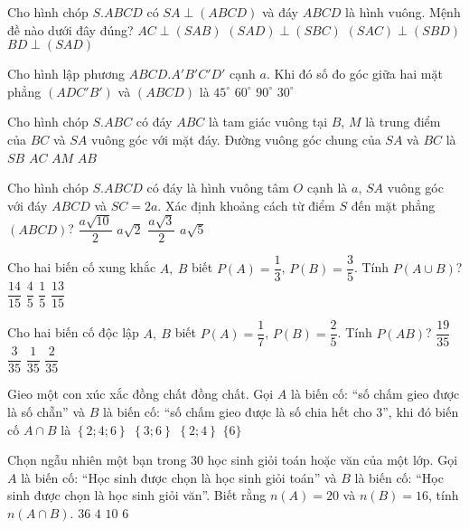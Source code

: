 \begin{ex}
Cho hình chóp $S.ABCD$ có $SA\perp (ABCD)$ và đáy $ABCD$ là hình vuông. Mệnh đề nào dưới đây đúng?
\choice
{$AC\perp (SAB)$}
{$(SAD)\perp (SBC)$}
{$(SAC)\perp (SBD)$}
{$BD\perp (SAD)$}
\end{ex}
\begin{ex}
Cho hình lập phương $ABCD.A'B'C'D'$ cạnh $a$. Khi đó số đo góc giữa hai mặt phẳng $\left(ADC'B'\right)$ và $(ABCD)$ là
\choice
{$45^\circ $}
{$60^\circ $}
{$90^\circ $}
{$30^\circ $}
\end{ex}
\begin{ex}
Cho hình chóp $S.ABC$ có đáy $ABC$ là tam giác vuông tại $B$, $M$ là trung điểm của $BC$ và $SA$ vuông góc với mặt đáy. Đường vuông góc chung của $SA$ và $BC$ là
\choice
{$SB$}
{$AC$}
{$AM$}
{$AB$}
\end{ex}
\begin{ex}
Cho hình chóp $S.ABCD$ có đáy là hình vuông tâm $O$ cạnh là $a$, $SA$ vuông góc với đáy $ABCD$ và $SC=2a$. Xác định khoảng cách từ điểm $S$ đến mặt phẳng$(ABCD)$?
\choice
{$\dfrac{a\sqrt{10}}{2}$}
{$a\sqrt{2}$}
{$\dfrac{a\sqrt{3}}{2}$}
{$a\sqrt{5}$}
\end{ex}
\begin{ex}
Cho hai biến cố xung khắc $A,\ B$ biết $P(A)=\dfrac{1}{3}$, $P(B)=\dfrac{3}{5}$. Tính $P\left(A\cup B\right)$?
\choice
{$\dfrac{14}{15}$}
{$\dfrac{4}{5}$}
{$\dfrac{1}{5}$}
{$\dfrac{13}{15}$}
\end{ex}
\begin{ex}
Cho hai biến cố độc lập $A,\ B$ biết $P(A)=\dfrac{1}{7}$, $P(B)=\dfrac{2}{5}$. Tính $P\left(AB\right)$?
\choice
{$\dfrac{19}{35}$}
{$\dfrac{3}{35}$}
{$\dfrac{1}{35}$}
{$\dfrac{2}{35}$}
\end{ex}
\begin{ex}
Gieo một con xúc xắc đồng chất đồng chất. Gọi $A$ là biến cố: “số chấm gieo được là số chẵn” và $B$ là biến cố: “số chấm gieo được là số chia hết cho 3”, khi đó biến cố $A\cap B$ là
\choice
{$\left\{ 2;4;6 \right\}$}
{$\left\{ 3;6 \right\}$}
{$\left\{ 2;4 \right\}$}
{$\{6\}$}
\end{ex}
\begin{ex}
Chọn ngẫu nhiên một bạn trong 30 học sinh giỏi toán hoặc văn của một lớp. Gọi $A$ là biến cố: “Học sinh được chọn là học sinh giỏi toán” và $B$ là biến cố: “Học sinh được chọn là học sinh giỏi văn”. Biết rằng $n(A)=20$ và $n(B)=16$, tính $n\left(A\cap B\right)$.
\choice
{$36$}
{$4$}
{$10$}
{$6$}
\end{ex}
